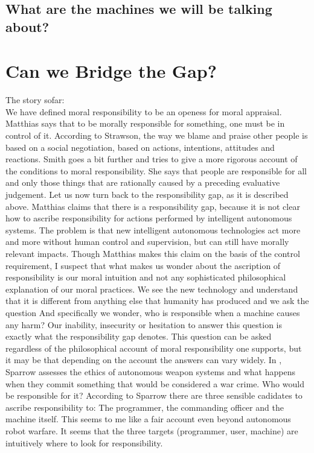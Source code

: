 \documentclass{article}
\begin{document}
\subsection{What are the machines we will be talking about?}
\section{Can we Bridge the Gap?}

The story sofar:\\
We have defined moral responsibility to be an openess for moral appraisal.
Matthias says that to be morally responsible for something, one must be in
control of it. According to Strawson, the way we blame and praise other people
is based on a social negotiation, based on actions, intentions, attitudes and
reactions. Smith goes a bit further and tries to give a more rigorous account of
the conditions to moral responsibility. She says that people are responsible for
all and only those things that are rationally caused by a preceding evaluative
judgement. Let us now turn back to the responsibility gap, as it is described
above. Matthias claims that there is a responsibility gap, because it is not
clear how to ascribe responsibility for actions performed by intelligent
autonomous systems. The problem is that new intelligent autonomous technologies
act more and more without human control and supervision, but can still have
morally relevant impacts. Though Matthias makes this claim on the basis of the
control requirement, I suspect that what makes us wonder about the
ascription of responsibility is our moral intuition and not any sophisticated
philosophical explanation of our moral practices. We see the new technology and
understand that it is different from anything else that humanity has produced
and we ask the question  And specifically we
wonder, who is responsible when a machine causes any harm?
Our inability, insecurity or hesitation to answer this question is exactly what
the responsibility gap denotes.
This question can be
asked regardless of the philosophical account of moral responsibility one
supports, but it may be that depending on the account the answers can vary
widely. In , Sparrow assesses the ethics of autonomous
weapon systems and what happens when they commit something that would be
considered a war crime. Who would be responsible for it? According to Sparrow
there are three sensible cadidates to ascribe responsibility to: The programmer,
the commanding officer and the machine itself. This seems to me like a fair
account even beyond autonomous robot warfare. It seems that the three targets
(programmer, user, machine) are intuitively where to look for responsibility.
\end{document}

